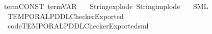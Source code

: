 \begin{isabellebody}
\ \ term{\isachardot}{\kern0pt}CONST\ term{\isachardot}{\kern0pt}VAR\ \isanewline
\ \ String{\isachardot}{\kern0pt}explode\ String{\isachardot}{\kern0pt}implode\isanewline
\ \ \ SML\isanewline
\ \ \ TEMPORAL{\isacharunderscore}{\kern0pt}PDDL{\isacharunderscore}{\kern0pt}Checker{\isacharunderscore}{\kern0pt}Exported\isanewline
\ \ \ {\isachardoublequoteopen}code{\isacharslash}{\kern0pt}TEMPORAL{\isacharunderscore}{\kern0pt}PDDL{\isacharunderscore}{\kern0pt}Checker{\isacharunderscore}{\kern0pt}Exported{\isachardot}{\kern0pt}sml{\isachardoublequoteclose}\isanewline
\ \ \ \ \isanewline
\isanewline
\isanewline
\isanewline
\isanewline
%
\isadelimtheory
\isanewline
%
\endisadelimtheory
%
\isatagtheory
{}\isamarkupfalse%
\ %
%
\endisatagtheory
{\isafoldtheory}%
%
\isadelimtheory
%
\endisadelimtheory
%
\end{isabellebody}%
\endinput

